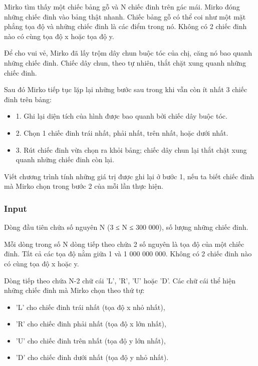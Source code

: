 



   Mirko tìm thấy một chiếc bảng gỗ và N chiếc đinh trên gác mái. Mirko đóng những chiếc đinh vào bảng thật nhanh. Chiếc bảng gỗ có thể coi như một mặt phẳng tọa độ và những chiếc đinh là các điểm trong nó. Không có 2 chiếc đinh nào có cùng tọa độ x hoặc tọa độ y.  

   Để cho vui vẻ, Mirko đã lấy trộm dây chun buộc tóc của chị, căng nó bao quanh những chiếc đinh. Chiếc dây chun, theo tự nhiên, thắt chặt xung quanh những chiếc đinh.  

   Sau đó Mirko tiếp tục lặp lại những bước sau trong khi vẫn còn ít nhất 3 chiếc đinh trên bảng:  
\begin{itemize}
	\item     1. Ghi lại diện tích của hình được bao quanh bởi chiếc dây buộc tóc.   
	\item     2. Chọn 1 chiếc đinh trái nhất, phải nhất, trên nhất, hoặc dưới nhất.   
	\item     3. Rút chiếc đinh vừa chọn ra khỏi bảng; chiếc dây chun lại thắt chặt xung quanh những chiếc đinh còn lại.   
\end{itemize}  Viết chương trình tính những giá trị được ghi lại ở bước 1, nếu ta biết chiếc đinh mà Mirko chọn trong bước 2 của mỗi lần thực hiện.  

\subsubsection{   Input  }

   Dòng đầu tiên chứa số nguyên N (3 ≤ N ≤ 300 000), số lượng những chiếc đinh.  

   Mỗi dòng trong số N dòng tiếp theo chứa 2 số nguyên là tọa độ của một chiếc đinh. Tất cả các tọa độ nằm giữa 1 và 1 000 000 000. Không có 2 chiếc đinh nào có cùng tọa độ x hoặc y.  

   Dòng tiếp theo chứa N-2 chữ cái 'L', 'R', 'U' hoặc 'D'. Các chữ cái thể hiện những chiếc đinh mà Mirko chọn theo thứ tự:  
\begin{itemize}
	\item     'L' cho chiếc đinh trái nhất (tọa độ x nhỏ nhất),   
	\item     'R' cho chiếc đinh phải nhất (tọa độ x lớn nhất),   
	\item     'U' cho chiếc đinh trên nhất (tọa độ y lớn nhất),   
	\item     'D' cho chiếc đinh dưới nhất (tọa độ y nhỏ nhất).   
\end{itemize}

